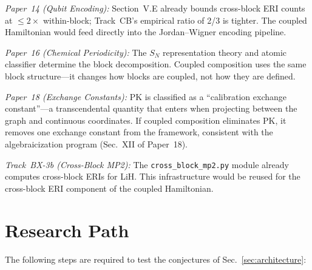 \documentclass[aps,pra,twocolumn,superscriptaddress,longbibliography]{revtex4-2}
\begin{document}
\emph{Paper~14 (Qubit Encoding):} Section~V.E already bounds
cross-block ERI counts at $\le 2\times$ within-block; Track~CB's
empirical ratio of 2/3 is tighter.  The coupled Hamiltonian would
feed directly into the Jordan--Wigner encoding pipeline.

\emph{Paper~16 (Chemical Periodicity):} The $S_N$ representation
theory and atomic classifier determine the block decomposition.
Coupled composition uses the same block structure---it changes how
blocks are coupled, not how they are defined.

\emph{Paper~18 (Exchange Constants):} PK is classified as a
``calibration exchange constant''---a transcendental quantity that
enters when projecting between the graph and continuous coordinates.
If coupled composition eliminates PK, it removes one exchange constant
from the framework, consistent with the algebraicization program
(Sec.~XII of Paper~18).

\emph{Track~BX-3b (Cross-Block MP2):} The \texttt{cross\_block\_mp2.py}
module already computes cross-block ERIs for LiH.  This infrastructure
would be reused for the cross-block ERI component of the coupled
Hamiltonian.


\section{Research Path}
\label{sec:path}

The following steps are required to test the conjectures of
Sec.~\ref{sec:architecture}:
\end{document}
